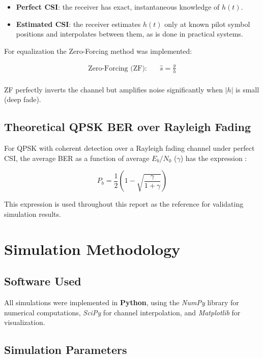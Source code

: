\documentclass[12pt]{article}
\begin{document}
\begin{itemize}
    \item \textbf{Perfect CSI}: the receiver has exact,
    instantaneous knowledge of $h(t)$.
    \item \textbf{Estimated CSI}: the receiver estimates $h(t)$
    only at known pilot symbol positions and interpolates
    between them, as is done in practical systems.
\end{itemize}

For equalization the Zero-Forcing method was implemented:

\begin{align}
    \text{Zero-Forcing (ZF):} \quad & \hat{s} = \frac{y}{h} \label{eq:zf}\\
\end{align}

ZF perfectly inverts the channel but amplifies noise
significantly when $|h|$ is small (deep fade).

\subsection{Theoretical QPSK BER over Rayleigh Fading}

For QPSK with coherent detection over a Rayleigh fading channel
under perfect CSI, the average BER as a function of average
$E_b/N_0$ ($\gamma$) has the expression
\cite{simon_alouini}:

\begin{equation}
    P_b = \frac{1}{2}\left(1 - \sqrt{\frac{\gamma}{1+\gamma}}\right)
    \label{eq:theoretical_ber}
\end{equation}

This expression is used throughout this report as the reference
for validating simulation results.


\section{Simulation Methodology}
\subsection{Software Used}

All simulations were implemented in \textbf{Python}, using the \textit{NumPy}  
library for numerical computations, \textit{SciPy} for channel interpolation, and 
\textit{Matplotlib} for visualization. 

\subsection{Simulation Parameters}
\end{document}
